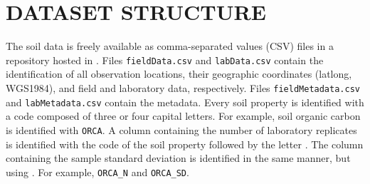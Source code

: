 
\section{DATASET STRUCTURE}

The soil data is 
freely available as comma-separated values (CSV) files in a repository hosted in \dnosgeneral{}. Files 
\texttt{fieldData.csv} and \texttt{labData.csv} contain the identification of all observation locations, their 
geographic coordinates (latlong, WGS1984), and field and laboratory data, respectively. Files 
\texttt{fieldMetadata.csv} and \texttt{labMetadata.csv} contain the metadata. Every soil property is 
identified with a code composed of three or four capital letters. For example, soil organic carbon is 
identified with \texttt{ORCA}. A column containing the number of laboratory replicates is identified with the 
code of the soil property followed by the letter . The column containing the sample standard deviation is 
identified in the same manner, but using . For example, \texttt{ORCA\_N} and \texttt{ORCA\_SD}.


